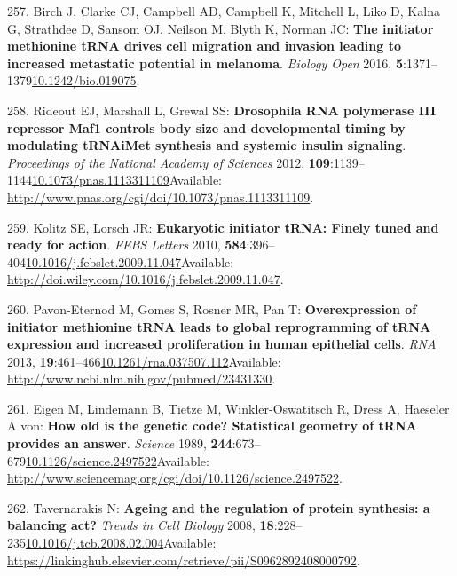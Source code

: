 \documentclass[
]{book}
\begin{document}
\leavevmode\hypertarget{ref-Birch2016}{}%
257. Birch J, Clarke CJ, Campbell AD, Campbell K, Mitchell L, Liko D, Kalna G, Strathdee D, Sansom OJ, Neilson M, Blyth K, Norman JC: \textbf{The initiator methionine tRNA drives cell migration and invasion leading to increased metastatic potential in melanoma}. \emph{Biology Open} 2016, \textbf{5}:1371--1379\href{https://doi.org/10.1242/bio.019075}{10.1242/bio.019075}.

\leavevmode\hypertarget{ref-Rideout2012}{}%
258. Rideout EJ, Marshall L, Grewal SS: \textbf{Drosophila RNA polymerase III repressor Maf1 controls body size and developmental timing by modulating tRNAiMet synthesis and systemic insulin signaling}. \emph{Proceedings of the National Academy of Sciences} 2012, \textbf{109}:1139--1144\href{https://doi.org/10.1073/pnas.1113311109}{10.1073/pnas.1113311109}Available: \url{http://www.pnas.org/cgi/doi/10.1073/pnas.1113311109}.

\leavevmode\hypertarget{ref-Kolitz2010}{}%
259. Kolitz SE, Lorsch JR: \textbf{Eukaryotic initiator tRNA: Finely tuned and ready for action}. \emph{FEBS Letters} 2010, \textbf{584}:396--404\href{https://doi.org/10.1016/j.febslet.2009.11.047}{10.1016/j.febslet.2009.11.047}Available: \url{http://doi.wiley.com/10.1016/j.febslet.2009.11.047}.

\leavevmode\hypertarget{ref-Pavon-Eternod2013}{}%
260. Pavon-Eternod M, Gomes S, Rosner MR, Pan T: \textbf{Overexpression of initiator methionine tRNA leads to global reprogramming of tRNA expression and increased proliferation in human epithelial cells}. \emph{RNA} 2013, \textbf{19}:461--466\href{https://doi.org/10.1261/rna.037507.112}{10.1261/rna.037507.112}Available: \url{http://www.ncbi.nlm.nih.gov/pubmed/23431330}.

\leavevmode\hypertarget{ref-Eigen1989}{}%
261. Eigen M, Lindemann B, Tietze M, Winkler-Oswatitsch R, Dress A, Haeseler A von: \textbf{How old is the genetic code? Statistical geometry of tRNA provides an answer}. \emph{Science} 1989, \textbf{244}:673--679\href{https://doi.org/10.1126/science.2497522}{10.1126/science.2497522}Available: \url{http://www.sciencemag.org/cgi/doi/10.1126/science.2497522}.

\leavevmode\hypertarget{ref-Tavernarakis2008}{}%
262. Tavernarakis N: \textbf{Ageing and the regulation of protein synthesis: a balancing act?} \emph{Trends in Cell Biology} 2008, \textbf{18}:228--235\href{https://doi.org/10.1016/j.tcb.2008.02.004}{10.1016/j.tcb.2008.02.004}Available: \url{https://linkinghub.elsevier.com/retrieve/pii/S0962892408000792}.
\end{document}
